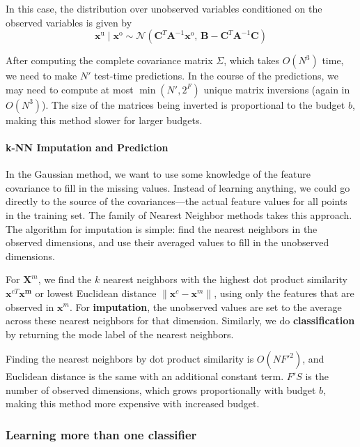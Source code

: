 In this case, the distribution over unobserved variables conditioned on the observed variables is given by
\begin{equation}
\mathbf{x}^\text{u} \mid \mathbf{x}^\text{o} \sim \mathcal{N} \left( \mathbf{C}^T \mathbf{A}^{-1} \mathbf{x}^\text{o},\, \mathbf{B} - \mathbf{C}^T \mathbf{A}^{-1} \mathbf{C} \right)
\end{equation}

After computing the complete covariance matrix $\Sigma$, which takes $O(N^3)$ time, we need to make $N'$ test-time predictions.
In the course of the predictions, we may need to compute at most $\min(N', 2^F)$ unique matrix inversions (again in $O(N^3)$).
The size of the matrices being inverted is proportional to the budget $b$, making this method slower for larger budgets.

\paragraph{k-NN Imputation and Prediction}
In the Gaussian method, we want to use some knowledge of the feature covariance to fill in the missing values.
Instead of learning anything, we could go directly to the source of the covariances---the actual feature values for all points in the training set.
The family of Nearest Neighbor methods takes this approach.
The algorithm for imputation is simple: find the nearest neighbors in the observed dimensions, and use their averaged values to fill in the unobserved dimensions.

For $\mathbf{X}^m$, we find the $k$ nearest neighbors with the highest dot product similarity $\mathbf{x}^{cT} \mathbf{x^m}$ or lowest Euclidean distance $\| \mathbf{x}^{c} - \mathbf{x}^{m} \|$, using only the features that are observed in $\mathbf{x}^{m}$.
For \textbf{imputation}, the unobserved values are set to the average across these nearest neighbors for that dimension.
Similarly, we do \textbf{classification} by returning the mode label of the nearest neighbors.

Finding the nearest neighbors by dot product similarity is $O(NF'^2)$, and Euclidean distance is the same with an additional constant term.
$F'S$ is the number of observed dimensions, which grows proportionally with budget $b$, making this method more expensive with increased budget.

\subsubsection{Learning more than one classifier}

